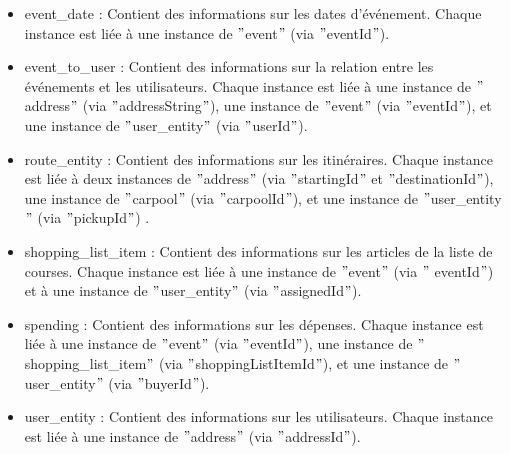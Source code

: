 \begin{itemize}
    \item event_date : Contient des informations sur les dates d'événement.
    Chaque instance est liée à une instance de \("\)event\("\) (via \("\)eventId\("\)).
    \item event_to_user : Contient des informations sur la relation entre les événements et les utilisateurs.
    Chaque instance est liée à une instance de \("\)address\("\) (via \("\)addressString\("\)), une instance de \("\)event\("\) (via \("\)eventId\("\)), et une instance de \("\)user\_entity\("\) (via \("\)userId\("\)).
    \item route_entity : Contient des informations sur les itinéraires.
    Chaque instance est liée à deux instances de \("\)address\("\) (via \("\)startingId\("\) et \("\)destinationId\("\)), une instance de \("\)carpool\("\) (via \("\)carpoolId\("\)), et une instance de \("\)user\_entity\("\) (via \("\)pickupId\("\)) .
    \item shopping_list_item : Contient des informations sur les articles de la liste de courses.
    Chaque instance est liée à une instance de \("\)event\("\) (via \("\) eventId\("\)) et à une instance de \("\)user\_entity\("\) (via \("\)assignedId\("\)).
    \item spending : Contient des informations sur les dépenses.
    Chaque instance est liée à une instance de \("\)event\("\) (via \("\)eventId\("\)), une instance de \("\)shopping\_list\_item\("\) (via \("\)shoppingListItemId\("\)), et une instance de \("\)user\_entity\("\) (via \("\)buyerId\("\)).
    \item user_entity : Contient des informations sur les utilisateurs.
    Chaque instance est liée à une instance de \("\)address\("\) (via \("\)addressId\("\)).
\end{itemize}

